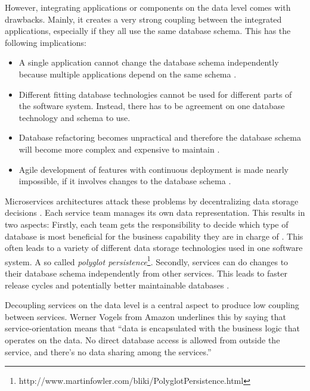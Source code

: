 However, integrating applications or components on the data level comes with drawbacks.
Mainly, it creates a very strong coupling between the integrated applications, especially if they all use the same database schema. 
This has the following implications:
\begin{itemize}
\item A single application cannot change the database schema independently because multiple applications depend on the same schema  \cite[p. 187f.]{Wolff2016}. 
\item Different fitting database technologies cannot be used for different parts of the software system.
Instead, there has to be agreement on one database technology and schema to use.
\item Database refactoring becomes unpractical and therefore the database schema will become more complex and expensive to maintain \cite{FowlerEvolutionDatabase2015} \cite[p. 187]{Wolff2016}.
\item Agile development of features with continuous deployment is made nearly impossible, if it involves changes to the database schema \cite[p. 187]{Wolff2016}.
\end{itemize}

Microservices architectures attack these problems by decentralizing data storage decisions \cite{FowlerDecentralizedData2014}.
Each service team manages its own data representation.
This results in two aspects:
Firstly, each team gets the responsibility to decide which type of database is most beneficial for the business capability they are in charge of \cite{FowlerDecentralizedData2014}.
This often leads to a variety of different data storage technologies used in one software system.
A so called \textit{polyglot persistence}\footnote{http://www.martinfowler.com/bliki/PolyglotPersistence.html}.
Secondly, services can do changes to their database schema independently from other services.
This leads to faster release cycles and potentially better maintainable databases \cite[p. 187]{Wolff2016}.

Decoupling services on the data level is a central aspect to produce low coupling between services.
Werner Vogels from Amazon underlines this by saying that service-orientation means that ``data is encapsulated with the business logic that operates on the data. No direct database access is allowed from outside the service, and there’s no data sharing among the services.'' \cite{Vogels2006}  


